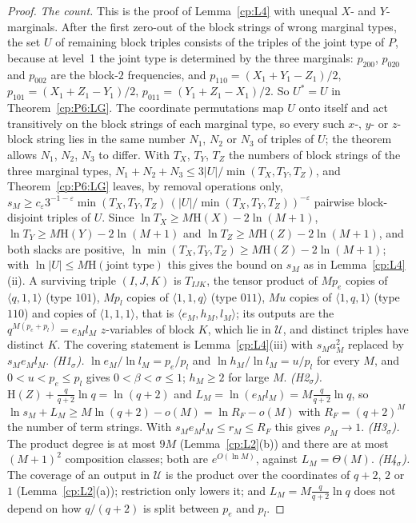 \documentclass[11pt]{article}
\theoremstyle{definition}
\theoremstyle{remark}
\providecommand{\eps}{\varepsilon}
\newcommand{\abs}[1]{\lvert #1\rvert}
\newcommand{\Ent}{\mathrm{H}}                 %
\newcommand{\mat}[3]{\langle #1,#2,#3\rangle} %
\newcommand{\Hscond}[1]{\textup{(H#1$_\sigma$)}} %
\newcommand{\Ukept}{\mathcal{U}}              %
\begin{document}
\begin{proof}
\emph{The count.} This is the proof of Lemma~\ref{cp:L4} with unequal $X$- and $Y$-marginals. After the first zero-out of the block strings of wrong marginal types, the set $U$ of remaining block triples consists of the triples of the joint type of $P$, because at level~1 the joint type is determined by the three marginals: $p_{200}$, $p_{020}$ and $p_{002}$ are the block-$2$ frequencies, and $p_{110}=(X_1+Y_1-Z_1)/2$, $p_{101}=(X_1+Z_1-Y_1)/2$, $p_{011}=(Y_1+Z_1-X_1)/2$. So $U^*=U$ in Theorem~\ref{cp:P6:LG}. The coordinate permutations map $U$ onto itself and act transitively on the block strings of each marginal type, so every such $x$-, $y$- or $z$-block string lies in the same number $N_1$, $N_2$ or $N_3$ of triples of $U$; the theorem allows $N_1$, $N_2$, $N_3$ to differ. With $T_X$, $T_Y$, $T_Z$ the numbers of block strings of the three marginal types, $N_1+N_2+N_3\le3\abs U/\min(T_X,T_Y,T_Z)$, and Theorem~\ref{cp:P6:LG} leaves, by removal operations only, $s_M\ge c_\eps3^{-1-\eps}\min(T_X,T_Y,T_Z)\,(\abs U/\min(T_X,T_Y,T_Z))^{-\eps}$ pairwise block-disjoint triples of $U$. Since $\ln T_X\ge M\Ent(X)-2\ln(M+1)$, $\ln T_Y\ge M\Ent(Y)-2\ln(M+1)$ and $\ln T_Z\ge M\Ent(Z)-2\ln(M+1)$, and both slacks are positive, $\ln\min(T_X,T_Y,T_Z)\ge M\Ent(Z)-2\ln(M+1)$; with $\ln\abs U\le M\Ent(\text{joint type})$ this gives the bound on $s_M$ as in Lemma~\ref{cp:L4}(ii). A surviving triple $(I,J,K)$ is $T_{IJK}$, the tensor product of $Mp_e$ copies of $\mat q11$ (type $101$), $Mp_l$ copies of $\mat11q$ (type $011$), $Mu$ copies of $\mat1q1$ (type $110$) and copies of $\mat111$, that is $\mat{e_M}{h_M}{l_M}$; its outputs are the $q^{M(p_e+p_l)}=e_Ml_M$ $z$-variables of block $K$, which lie in $\Ukept$, and distinct triples have distinct $K$. The covering statement is Lemma~\ref{cp:L4}(iii) with $s_Ma_M^2$ replaced by $s_Me_Ml_M$.
\emph{\Hscond1.} $\ln e_M/\ln l_M=p_e/p_l$ and $\ln h_M/\ln l_M=u/p_l$ for every $M$, and $0<u<p_e\le p_l$ gives $0<\beta<\sigma\le1$; $h_M\ge2$ for large $M$.
\emph{\Hscond2.} $\Ent(Z)+\frac q{q+2}\ln q=\ln(q+2)$ and $L_M=\ln(e_Ml_M)=M\frac q{q+2}\ln q$, so $\ln s_M+L_M\ge M\ln(q+2)-o(M)=\ln R_F-o(M)$ with $R_F=(q+2)^M$ the number of term strings. With $s_Me_Ml_M\le r_M\le R_F$ this gives $\rho_M\to1$.
\emph{\Hscond3.} The product degree is at most $9M$ (Lemma~\ref{cp:L2}(b)) and there are at most $(M+1)^2$ composition classes; both are $e^{O(\ln M)}$, against $L_M=\Theta(M)$.
\emph{\Hscond4.} The coverage of an output in $\Ukept$ is the product over the coordinates of $q+2$, $2$ or $1$ (Lemma~\ref{cp:L2}(a)); restriction only lowers it; and $L_M=M\frac q{q+2}\ln q$ does not depend on how $q/(q+2)$ is split between $p_e$ and $p_l$.

\end{proof}
\end{document}
